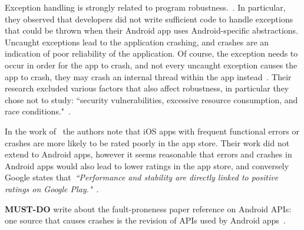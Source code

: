 Exception handling is strongly related to program robustness.~\citep{Oliveira_Borges_Silva_Cacho_Castor_2018_android_error_handling}. In particular, they observed that developers did not write sufficient code to handle exceptions that could be thrown when their Android app uses Android-specific abstractions. Uncaught exceptions lead to the application crashing, and crashes are an indication of poor reliability of the application. Of course, the exception needs to occur in order for the app to crash, and not every uncaught exception causes the app to crash, they may crash an internal thread within the app instead~\citep{Oliveira_Borges_Silva_Cacho_Castor_2018_android_error_handling}. %
Their research excluded various factors that also affect robustness, in particular they chose not to study: ``security vulnerabilities, excessive resource consumption, and race conditions."~\citep{Oliveira_Borges_Silva_Cacho_Castor_2018_android_error_handling}. %

In the work of~\citep{khalid2015_what_do_mobile_app_users_complain_about} the authors note that iOS apps with frequent functional errors or crashes are more likely to be rated poorly in the app store. Their work did not extend to Android apps, however it seems reasonable that errors and crashes in Android apps would also lead to lower ratings in the app store, and conversely Google states that~\emph{``Performance and stability are directly linked to positive ratings on Google Play."}~\citep{android_vitals_best_practices}.

\textbf{MUST-DO} write about the fault-proneness paper reference on Android APIs: one source that causes crashes is the revision of APIs used by Android apps~\citep{linares2013_api_change_and_fault_proneness_android}.

